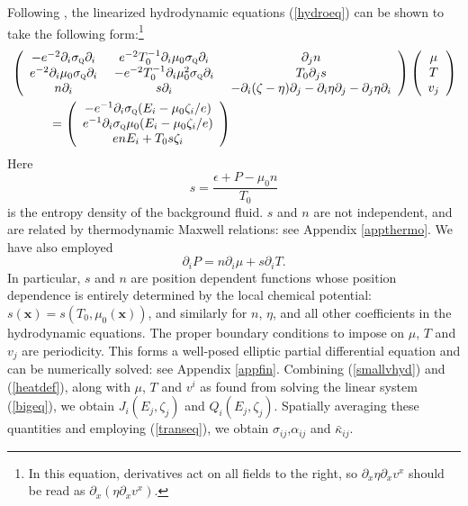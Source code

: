 \documentclass[10pt, oneside]{book}
\begin{document}
\begin{doublespace}
Following \cite{Lucas:2015lna}, the linearized hydrodynamic equations (\ref{hydroeq}) can be shown to take the following form:\footnote{In this equation, derivatives act on all fields to the right, so $\partial_x \eta \partial_x v^x$ should be read as $\partial_x (\eta \partial_x v^x)$.} \begin{align}
 &\left(\begin{array}{ccc} - e^{-2}\partial_i \sigma_{\textsc{q}} \partial_i  &\  e^{-2}T_0^{-1} \partial_i \mu_0\sigma_{\textsc{q}} \partial_i  &\ \partial_j n   \\ e^{-2} \partial_i \mu_0\sigma_{\textsc{q}} \partial_i  &\ -e^{-2} T^{-1}_0\partial_i \mu_0^2\sigma_{\textsc{q}} \partial_i  &\ T_0\partial_j s  \\ n\partial_i   &\ s\partial_i  &\  - \partial_i (\zeta-\eta)\partial_j  - \partial_i \eta \partial_j - \partial_j \eta \partial_i  \end{array}\right)  \left(\begin{array}{c} \mu \\ T \\ v_j\end{array}\right) \notag \\
&\;\;\;\;\;\;\;\;\;\;\;  = \left(\begin{array}{c} -e^{-1}\partial_i \sigma_{\textsc{q}} (E_i - \mu_0 \zeta_i/e) \\ e^{-1} \partial_i \sigma_{\textsc{q}}  \mu_0 (E_i - \mu_0 \zeta_i/e) \\ en E_i + T_0 s\zeta_i \end{array}\right)  \label{bigeq}
\end{align}
Here \begin{equation}
s = \frac{\epsilon+P - \mu_0 n}{T_0}
\end{equation}is the entropy density of the background fluid.   $s$ and $n$ are not independent, and are related by thermodynamic Maxwell relations:  see Appendix \ref{appthermo}.   We have also employed \begin{equation}
\partial_i P =  n \partial_i \mu + s\partial_i T. 
\end{equation}
In particular, $s$ and $n$ are position dependent functions whose position dependence is entirely determined by the local chemical potential:  $s(\mathbf{x}) = s(T_0,\mu_0(\mathbf{x}))$, and similarly for $n$, $\eta$, and all other coefficients in the hydrodynamic equations.   The proper boundary conditions to impose on $\mu$, $T$ and $v_j$ are periodicity.   This forms a well-posed elliptic partial differential equation and can be numerically solved: see Appendix \ref{appfin}.   Combining (\ref{smallvhyd}) and (\ref{heatdef}), along with $\mu$, $T$ and $v^i$ as found from solving the linear system (\ref{bigeq}), we obtain $J_i(E_j,\zeta_j)$ and $Q_i(E_j,\zeta_j)$.  Spatially averaging these quantities and employing (\ref{transeq}), we obtain $\sigma_{ij}$,$\alpha_{ij}$ and $\bar\kappa_{ij}$. 


\end{doublespace}
\end{document}
